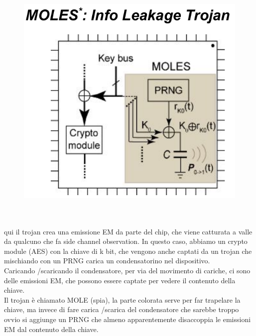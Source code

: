 \documentclass[oneside, 12pt]{extbook}
\begin{document}
\begin{figure}[!h]
	\includegraphics[scale=0.4]{immagini/hardware/MOLE.png}
\end{figure}
\\\\qui il trojan crea una emissione EM da parte del chip, che viene catturata a valle da qualcuno che fa side channel observation. In questo caso, abbiamo un crypto module (AES) con la chiave di k bit, che vengono anche captati da un trojan che mischiando con un PRNG carica un condensatorino nel dispositivo.
\\Caricando /scaricando il condensatore, per via del movimento di cariche, ci sono delle emissioni EM, che possono essere captate per vedere il contenuto della chiave.
\\Il trojan è chiamato MOLE (spia), la parte colorata serve per far trapelare la chiave, ma invece di fare carica /scarica del condensatore che sarebbe troppo ovvio si aggiunge un PRNG che almeno apparentemente disaccoppia le emissioni EM dal contenuto della chiave.
\end{document}
